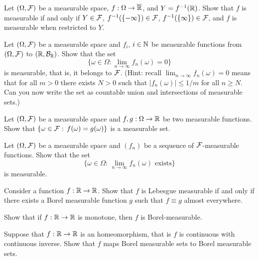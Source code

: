 \begin{problem}
    Let $(\Omega,\mathcal F)$ be a measurable space, $f:\Omega\to \overline{\mathbb R}$, and $Y = f^{-1}(\mathbb R)$. Show that $f$ is measurable if and only if $Y\in \mathcal F$, $f^{-1}(\{-\infty\})\in\mathcal F$, $f^{-1}(\{\infty\})\in \mathcal F$, and $f$ is measurable when restricted to $Y$.  
\end{problem}

\begin{problem}
    Let $(\Omega,\mathcal F)$ be a measurable space and $f_i$, $i\in \mathbb N$ be measurable functions from $(\Omega,\mathcal F)$ to $(\mathbb R,\mathcal B_{\mathbb R})$. Show that the set 
    \begin{equation*}
        \{\omega\in \Omega: \lim_{n\to \infty} f_n(\omega) = 0\}
    \end{equation*}
    is measurable, that is, it belongs to $\mathcal F$.
    (Hint: recall $\lim_{n\to \infty} f_n(\omega) = 0$ means that for all $m>0$ there exists $N>0$ such that $|f_n(\omega)|\leq 1/m$ for all $n\geq N$. Can you now write the set as countable union and intersections of measurable sets.)
\end{problem}

\begin{problem}
    Let  $(\Omega,\mathcal F)$ be a measurable space and $f,g:\Omega\to \mathbb R$ be two measurable functions. Show that $\{\omega\in \mathcal F:\, f(\omega) = g(\omega)\}$ is a measurable set.
\end{problem}

\begin{problem}
    Let  $(\Omega,\mathcal F)$ be a measurable space and $(f_n)$ be a sequence of $\mathcal F$-measurable functions. Show that the set 
    \begin{equation*}
        \{\omega\in \Omega:\, \lim_{n\to\infty} f_n(\omega) \text{ exists}\}
    \end{equation*}
    is measurable.
\end{problem}

\begin{problem} Consider a function $f:\mathbb R\to \mathbb R$. Show that $f$ is Lebesgue measurable if and only if there exists a Borel measurable function $g$ such that $f\equiv g$ almost everywhere.
\end{problem}

\begin{problem} Show that if $f:\mathbb R\to\mathbb R$ is monotone, then $f$ is Borel-measurable.
\end{problem}

\begin{problem} Suppose that $f:\mathbb R\to \mathbb R$ is an homeomorphism, that is $f$ is continuous with continuous inverse. Show that $f$ maps Borel measurable sets to Borel measurable sets.   
\end{problem}

